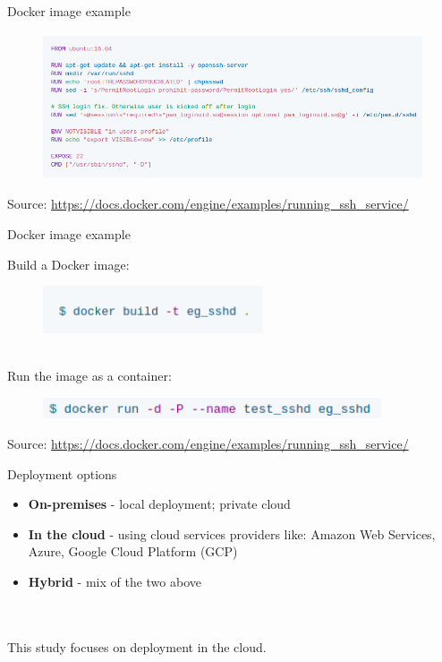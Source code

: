 \documentclass{beamer}
\begin{document}
\begin{frame}{Docker image example}%
	\begin{center}
		\begin{figure}
			\includegraphics[width=11.5cm]{figures/docker-image.png}
			\label{fig:micro-vs-mono}
		\end{figure} 
		\tiny{Source: \url{https://docs.docker.com/engine/examples/running_ssh_service/}}
		
	\end{center}
\end{frame}

\begin{frame}{Docker image example}%
	\begin{center}
		Build a Docker image:
	\begin{figure}
		\includegraphics[width=6.5cm]{figures/docker-image-build.png}
		\label{fig:micro-vs-mono}
	\end{figure} \\
	Run the image as a container:\\
	\begin{figure}
		\includegraphics[width=10cm]{figures/docker-run.png}
		\label{fig:micro-vs-mono}
	\end{figure} 
	\tiny{Source: \url{https://docs.docker.com/engine/examples/running_ssh_service/}}
\end{center}
\end{frame}


\begin{frame}{Deployment options}%
\begin{itemize}
	\item \textbf{On-premises} - local deployment; private cloud
	\item \textbf{In the cloud} - using cloud services providers like: Amazon Web Services, Azure, Google Cloud Platform (GCP)
	\item \textbf{Hybrid} - mix of the two above
\end{itemize}
~\\
~\\
This study focuses on deployment in the cloud.
\end{frame}
\end{document}
